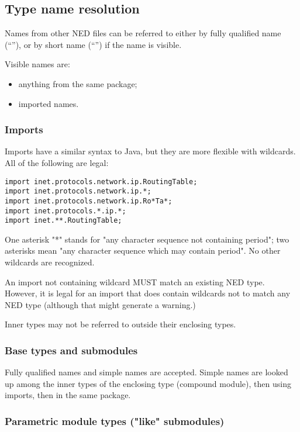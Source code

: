 \subsection{Type name resolution}
\label{ch-ned-ref:sec:type-name-resolution}

Names from other NED files can be referred to either by fully qualified
name (``''), or by short name
(``'') if the name is visible.

Visible names are:

\begin{itemize}
  \item anything from the same package;
  \item imported names.
\end{itemize}

\subsubsection{Imports}

Imports have a similar syntax to Java, but they are more flexible with wildcards.
All of the following are legal:
\begin{verbatim}
import inet.protocols.network.ip.RoutingTable;
import inet.protocols.network.ip.*;
import inet.protocols.network.ip.Ro*Ta*;
import inet.protocols.*.ip.*;
import inet.**.RoutingTable;
\end{verbatim}

One asterisk "*" stands for "any character sequence not containing
period"; two asterisks mean "any character sequence which may
contain period". No other wildcards are recognized.

An import not containing wildcard MUST match an existing NED type.
However, it is legal for an import that does contain wildcards
not to match any NED type (although that might generate a warning.)

Inner types may not be referred to outside their enclosing types.

\subsubsection{Base types and submodules}

Fully qualified names and simple names are accepted. Simple names
are looked up among the inner types of the enclosing type (compound
module), then using imports, then in the same package.


\subsubsection{Parametric module types ("like" submodules)}

